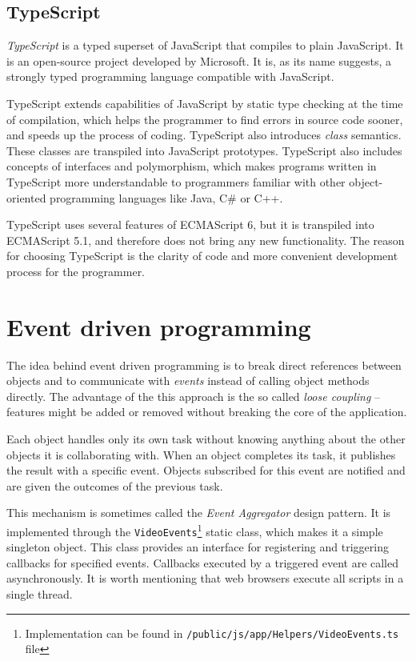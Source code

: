 \subsection{TypeScript}
\textit{TypeScript} is a typed superset of JavaScript that compiles to plain JavaScript\cite{typescript}. It is an open-source project developed by Microsoft. It is, as its name suggests, a strongly typed programming language compatible with JavaScript.

TypeScript extends capabilities of JavaScript by static type checking at the time of compilation, which helps the programmer to find errors in source code sooner, and speeds up the process of coding. TypeScript also introduces \textit{class} semantics. These classes are transpiled into JavaScript prototypes. TypeScript also includes concepts of interfaces and polymorphism, which makes programs written in TypeScript more understandable to programmers familiar with other object-oriented programming languages like Java, C\# or C++.

TypeScript uses several features of ECMAScript 6, but it is transpiled into ECMAScript 5.1, and therefore does not bring any new functionality. The reason for choosing TypeScript is the clarity of code and more convenient development process for the programmer.



\section{Event driven programming}
The idea behind event driven programming is to break direct references between objects and to communicate with \textit{events} instead of calling object methods directly. The advantage of the this approach is the so called \textit{loose coupling} \cite{loose_coupling} -- features might be added or removed without breaking the core of the application.

Each object handles only its own task without knowing anything about the other objects it is collaborating with. When an object completes its task, it publishes the result with a specific event. Objects subscribed for this event are notified and are given the outcomes of the previous task.

This mechanism is sometimes called the \textit{Event Aggregator} design pattern. It is implemented through the \verb|VideoEvents|\footnote{Implementation can be found in \texttt{/public/js/app/Helpers/VideoEvents.ts} file} static class, which makes it a simple singleton object. This class provides an interface for registering and triggering callbacks for specified events. Callbacks executed by a triggered event are called asynchronously. It is worth mentioning that web browsers execute all scripts in a single thread.

